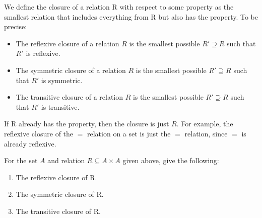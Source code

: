 \documentclass[12pt]{exam}
\begin{document}
We define the closure of a relation R with respect to some property as the smallest relation that includes everything from R but also has the property. To be precise:

\begin{itemize}
    \item The reflexive closure of a relation $R$ is the smallest possible $R' \supseteq R$ such that $R'$ is reflexive.
    \item The symmetric closure of a relation $R$ is the smallest possible $R' \supseteq R$ such that $R'$ is symmetric.
    \item The transitive closure of a relation $R$ is the smallest possible $R' \supseteq R$ such that $R'$ is transitive.
\end{itemize}

If R already has the property, then the closure is just $R$. For example, the reflexive closure of the $=$ relation on a set is just the $=$ relation, since $=$ is already reflexive.

For the set $A$ and relation $R \subseteq A \times A$ given above, give the following:

\begin{enumerate}
    \item The reflexive closure of R.
    \item The symmetric closure of R.
    \item The transitive closure of R.
\end{enumerate}
\end{document}
